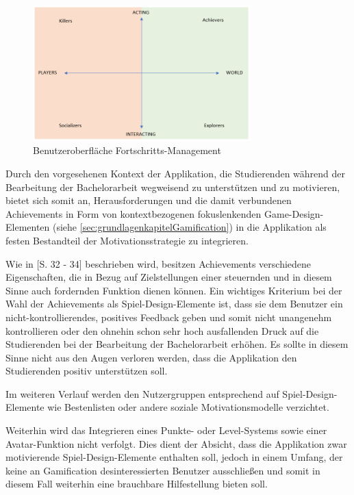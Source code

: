 \documentclass[bibliography=totoc,listof=totoc,BCOR=5mm,DIV=12,oneside]{scrbook}
\begin{document}
\begin{figure}[H]
	\centering
	\includegraphics[width=0.75\textwidth, keepaspectratio]{Bilder/Diagramme/InterestGraphBartleAchieversExplorers.png}
	\caption{Benutzeroberfläche Fortschritts-Management}
	\label{img:interestGraphBartleAchiversExplorers}
\end{figure}

\par Durch den vorgesehenen Kontext der Applikation, die Studierenden während der Bearbeitung der Bachelorarbeit wegweisend zu unterstützen und zu motivieren, bietet sich somit an, Herausforderungen und die damit verbundenen Achievements in Form von kontextbezogenen fokuslenkenden Game-Design-Elementen (siehe \ref{sec:grundlagenkapitelGamification}) in die Applikation als festen Bestandteil der Motivationsstrategie zu integrieren.

\par\medskip Wie in \citep{Sailer2016}[S. 32 - 34] beschrieben wird, besitzen Achievements verschiedene Eigenschaften, die in Bezug auf Zielstellungen einer steuernden und in diesem Sinne auch fordernden Funktion dienen können. Ein wichtiges Kriterium bei der Wahl der Achievements als Spiel-Design-Elemente ist, dass sie dem Benutzer ein nicht-kontrollierendes, positives Feedback geben und somit nicht unangenehm kontrollieren oder den ohnehin schon sehr hoch ausfallenden Druck auf die Studierenden bei der Bearbeitung der Bachelorarbeit erhöhen. Es sollte in diesem Sinne nicht aus den Augen verloren werden, dass die Applikation den Studierenden positiv unterstützen soll.

\par\medskip Im weiteren Verlauf werden den Nutzergruppen entsprechend auf Spiel-Design-Elemente wie Bestenlisten oder andere soziale Motivationsmodelle verzichtet.

\par Weiterhin wird das Integrieren eines Punkte- oder Level-Systems sowie einer Avatar-Funktion nicht verfolgt. Dies dient der Absicht, dass die Applikation zwar motivierende Spiel-Design-Elemente enthalten soll, jedoch in einem Umfang, der keine an Gamification desinteressierten Benutzer ausschließen und somit in diesem Fall weiterhin eine brauchbare Hilfestellung bieten soll.
\end{document}
